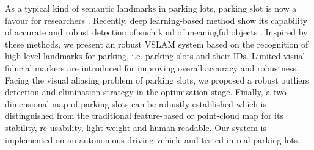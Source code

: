 \documentclass[journal]{IEEEtran}
\begin{document}
%

	
As a typical kind of semantic landmarks in parking lots, parking slot is now a favour for researchers
\citep{Houben:2015hq} \citep{Grimmett2015Integrating} \citep{Himstedt2017Online}.
Recently, deep learning-based method show its capability of  accurate and robust detection of such kind of meaningful objects \citep{zhanglin}. 
Inspired by these methods, we present an robust VSLAM system based on the recognition of high level landmarks for parking, i.e. parking slots and their IDs. 
Limited visual fiducial markers are introduced for improving overall accuracy and robustness. 
Facing the visual aliasing problem of parking slots, we proposed a robust outliers detection and elimination strategy in the optimization stage.
Finally, a two dimensional map of parking slots can be robustly established which is distinguished from the traditional feature-based or point-cloud map for its stability, re-usability, light weight and human readable.
Our system is implemented on an autonomous driving vehicle and tested in real parking lots.
\end{document}
